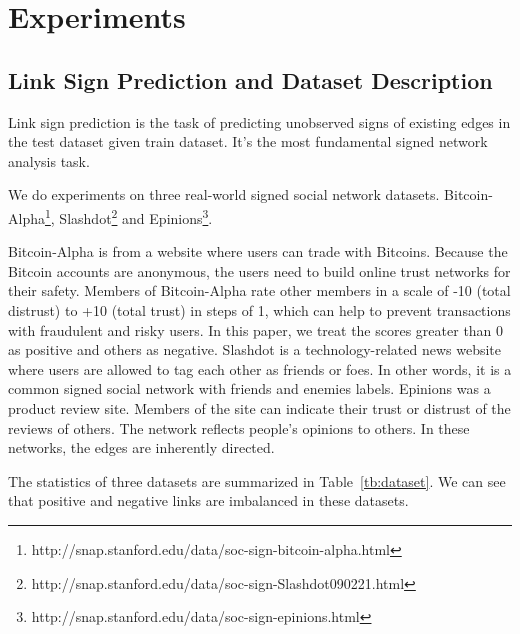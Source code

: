 \documentclass[runningheads]{llncs}
\begin{document}
\section{Experiments}\label{sec:experiments}
\subsection{Link Sign Prediction and Dataset Description}
Link sign prediction is the task of predicting unobserved signs of existing edges in the test dataset given train dataset. It's the most fundamental signed network analysis task\cite{leskovec2010predicting}.

We do experiments on three real-world signed social network datasets. \eg Bitcoin-Alpha\footnote{http://snap.stanford.edu/data/soc-sign-bitcoin-alpha.html}, Slashdot\footnote{http://snap.stanford.edu/data/soc-sign-Slashdot090221.html} and Epinions\footnote{http://snap.stanford.edu/data/soc-sign-epinions.html}. 

Bitcoin-Alpha\cite{kumar2016edge} is from a website where users can trade with Bitcoins. Because the Bitcoin accounts are anonymous, the users need to build online trust networks for their safety. Members of Bitcoin-Alpha rate other members in a scale of -10 (total distrust) to +10 (total trust) in steps of 1, which can help to prevent transactions with fraudulent and risky users. In this paper, we treat the scores greater than 0 as positive and others as negative. 
Slashdot\cite{leskovec2010signed} is a technology-related news website where users are allowed to tag each other as friends or foes. In other words, it is a common signed social network with friends and enemies labels.
Epinions\cite{leskovec2010signed} was a product review site. Members of the site can indicate their trust or distrust of the reviews of others. The network reflects people's opinions to others.
In these networks, the edges are inherently directed\cite{leskovec2010signed}.

The statistics of three datasets are summarized in Table~\ref{tb:dataset}. We can see that positive and negative links are imbalanced in these datasets.
\begin{table}[!ht]
\vspace{-10px}
    \centering
    \caption{Statistics of Three Datasets}
    \label{tb:dataset}
   
\vspace{-20px}
\end{table}
\end{document}

